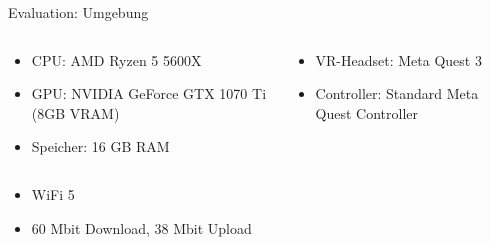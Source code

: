 \begin{frame}{Evaluation: Umgebung}{}
    \begin{columns}
            \begin{tcolorbox}[box1, boxsep=0.5em, height=3cm, title=\textbf{Backend-Hardware}]
                \begin{itemize}
                    \item CPU: AMD Ryzen 5 5600X
                    \item GPU: NVIDIA GeForce GTX 1070 Ti (8GB VRAM)
                    \item Speicher: 16 GB RAM
                \end{itemize}
            \end{tcolorbox}
            \begin{tcolorbox}[box2, boxsep=0.5em, height=3cm, title=\textbf{Frontend-Hardware}]
                \begin{itemize}
                    \item VR-Headset: Meta Quest 3
                    \item Controller: Standard Meta Quest Controller
                \end{itemize}
            \end{tcolorbox}
    \end{columns}
    
    \vfill

    \begin{tcolorbox}[box3, boxsep=0.5em, title=\textbf{Netzwerk}]
        \begin{itemize}
            \item WiFi 5
            \item 60 Mbit Download, 38 Mbit Upload
        \end{itemize}
    \end{tcolorbox}
\end{frame}


